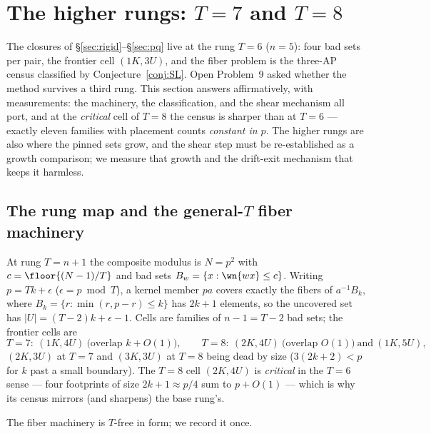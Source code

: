 
\section{The higher rungs: $T=7$ and $T=8$}\label{sec:higherrung}

The closures of \S\ref{sec:rigid}--\S\ref{sec:pq} live at the rung $T=6$
($n=5$): four bad sets per pair, the frontier cell $(1K,3U)$, and the
fiber problem is the three-AP census classified by Conjecture~\ref{conj:SL}.
Open Problem~9 asked whether the method survives a third rung. This
section answers affirmatively, with measurements: the machinery, the
classification, and the shear mechanism all port, and at the \emph{critical}
cell of $T=8$ the census is sharper than at $T=6$ --- exactly eleven
families with placement counts \emph{constant in $p$}. The higher rungs
are also where the pinned sets grow, and the shear step must be
re-established as a growth comparison; we measure that growth and the
drift-exit mechanism that keeps it harmless.

\subsection{The rung map and the general-\texorpdfstring{$T$}{T} fiber machinery}

At rung $T=n+1$ the composite modulus is $N=p^2$ with $c=\floor{(N-1)/T}$
and bad sets $B_w=\{x:\wn{wx}\le c\}$. Writing $p=Tk+\epsilon$
($\epsilon=p\bmod T$), a kernel member $pa$ covers exactly the fibers of
$a^{-1}B_k$, where $B_k=\{r:\min(r,p-r)\le k\}$ has $2k+1$ elements, so
the uncovered set has $|U|=(T-2)k+\epsilon-1$. Cells are families of
$n-1=T-2$ bad sets; the frontier cells are
\[
T=7:\ (1K,4U)\ \text{(overlap }k+O(1)\text{)},\qquad
T=8:\ (2K,4U)\ \text{(overlap }O(1)\text{)}\ \text{and}\ (1K,5U),
\]
$(2K,3U)$ at $T=7$ and $(3K,3U)$ at $T=8$ being dead by size
($3(2k+2)<p$ for $k$ past a small boundary). The $T=8$ cell $(2K,4U)$ is
\emph{critical} in the $T=6$ sense --- four footprints of size
$2k+1\approx p/4$ sum to $p+O(1)$ --- which is why its census mirrors
(and sharpens) the base rung's.

The fiber machinery is $T$-free in form; we record it once.

